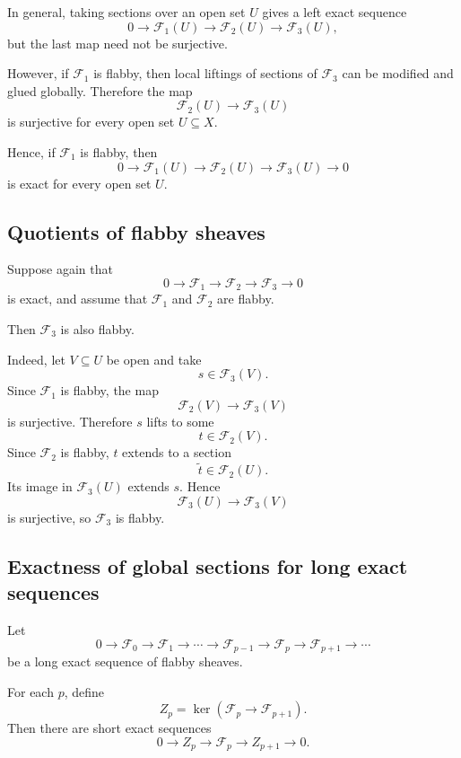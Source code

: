 In general, taking sections over an open set $U$ gives a left exact sequence
\[
0\longrightarrow \mathcal F_1(U)
\longrightarrow \mathcal F_2(U)
\longrightarrow \mathcal F_3(U),
\]
but the last map need not be surjective.

However, if $\mathcal F_1$ is flabby, then local liftings of sections of
$\mathcal F_3$ can be modified and glued globally. Therefore the map
\[
\mathcal F_2(U)\longrightarrow \mathcal F_3(U)
\]
is surjective for every open set $U\subseteq X$.

Hence, if $\mathcal F_1$ is flabby, then
\[
0\longrightarrow \mathcal F_1(U)
\longrightarrow \mathcal F_2(U)
\longrightarrow \mathcal F_3(U)
\longrightarrow 0
\]
is exact for every open set $U$.

\subsection*{Quotients of flabby sheaves}

Suppose again that
\[
0\longrightarrow \mathcal F_1
\longrightarrow \mathcal F_2
\longrightarrow \mathcal F_3
\longrightarrow 0
\]
is exact, and assume that $\mathcal F_1$ and $\mathcal F_2$ are flabby.

Then $\mathcal F_3$ is also flabby.

Indeed, let $V\subseteq U$ be open and take
\[
s\in \mathcal F_3(V).
\]
Since $\mathcal F_1$ is flabby, the map
\[
\mathcal F_2(V)\longrightarrow \mathcal F_3(V)
\]
is surjective. Therefore $s$ lifts to some
\[
t\in \mathcal F_2(V).
\]
Since $\mathcal F_2$ is flabby, $t$ extends to a section
\[
\widetilde t\in \mathcal F_2(U).
\]
Its image in $\mathcal F_3(U)$ extends $s$. Hence
\[
\mathcal F_3(U)\longrightarrow \mathcal F_3(V)
\]
is surjective, so $\mathcal F_3$ is flabby.

\subsection*{Exactness of global sections for long exact sequences}

Let
\[
0\longrightarrow \mathcal F_0
\longrightarrow \mathcal F_1
\longrightarrow \cdots
\longrightarrow \mathcal F_{p-1}
\longrightarrow \mathcal F_p
\longrightarrow \mathcal F_{p+1}
\longrightarrow \cdots
\]
be a long exact sequence of flabby sheaves.

For each $p$, define
\[
Z_p=\ker(\mathcal F_p\to \mathcal F_{p+1}).
\]
Then there are short exact sequences
\[
0\longrightarrow Z_p
\longrightarrow \mathcal F_p
\longrightarrow Z_{p+1}
\longrightarrow 0.
\]

